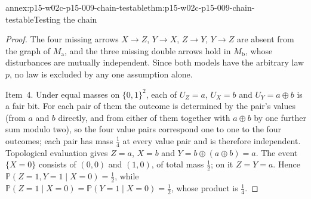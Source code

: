 \begin{annexitem}{annex:p15-w02c-p15-009-chain-testable}{thm:p15-w02c-p15-009-chain-testable}{Testing the chain}
\begin{proof}
The four missing arrows \(X\to Z\), \(Y\to X\), \(Z\to Y\), \(Y\to Z\)
are absent from the graph of \(M_{\mathrm a}\), and the three missing
double arrows hold in \(M_{\mathrm b}\), whose disturbances are mutually
independent. Since both models have the arbitrary law \(p\), no law is
excluded by any one assumption alone.

Item~4. Under equal masses on \(\{0,1\}^2\), each of \(U_Z=a\),
\(U_X=b\) and \(U_Y=a\oplus b\) is a fair bit. For each pair of them the
outcome is determined by the pair's values (from \(a\) and \(b\)
directly, and from either of them together with \(a\oplus b\) by one
further sum modulo two), so the four value pairs correspond one to one to
the four outcomes; each pair has mass \(\tfrac14\) at every value pair
and is therefore independent. Topological evaluation gives \(Z=a\),
\(X=b\) and \(Y=b\oplus(a\oplus b)=a\). The event \(\{X=0\}\) consists
of \((0,0)\) and \((1,0)\), of total mass \(\tfrac12\); on it
\(Z=Y=a\). Hence \(\mathbb P(Z=1,Y=1\mid X=0)=\tfrac12\), while
\(\mathbb P(Z=1\mid X=0)=\mathbb P(Y=1\mid X=0)=\tfrac12\), whose
product is \(\tfrac14\).
\end{proof}
\end{annexitem}

